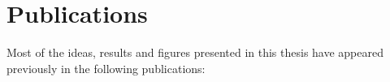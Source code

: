 \documentclass[../thesis.tex]{subfiles}
\begin{document}
\chapter*{Publications}

Most of the ideas, results and figures presented in this thesis have appeared previously
in the following publications:

\begin{refsection}[ownpubs]
    \small
    \nocite{*} %
    \printbibliography[heading=none]
\end{refsection}

\end{document}

